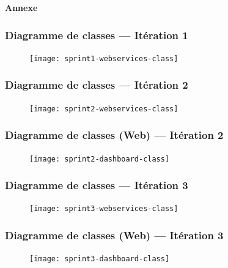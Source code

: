 \documentclass{beamer}
\begin{document}
\begin{frame}
    \begin{center}
        \bfseries \Huge
        Annexe
    \end{center}
\end{frame}


\begin{frame}
    \frametitle{Diagramme de classes --- Itération 1}
    \begin{figure}
        \texttt{[image: sprint1-webservices-class]}
    \end{figure}
\end{frame}

\begin{frame}
    \frametitle{Diagramme de classes --- Itération 2}
    \begin{figure}
        \texttt{[image: sprint2-webservices-class]}
    \end{figure}
\end{frame}

\begin{frame}
    \frametitle{Diagramme de classes (Web) --- Itération 2}
    \begin{figure}
        \texttt{[image: sprint2-dashboard-class]}
    \end{figure}
\end{frame}

\begin{frame}
    \frametitle{Diagramme de classes --- Itération 3}
    \begin{figure}
        \texttt{[image: sprint3-webservices-class]}
    \end{figure}
\end{frame}

\begin{frame}
    \frametitle{Diagramme de classes (Web) --- Itération 3}
    \begin{figure}
        \texttt{[image: sprint3-dashboard-class]}
    \end{figure}
\end{frame}
\end{document}
